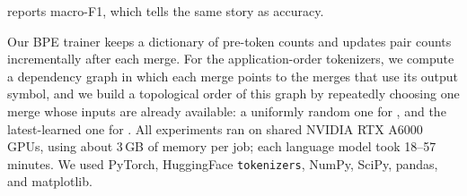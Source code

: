  reports macro-F1, which tells the same story as accuracy.

\begin{table}[h]
    \centering
    \caption{Fine-tuned macro-F1 (\%, mean $\pm$ sd over 4 runs) and relative change against \freq. Best mean per task in \textbf{bold}. Mean test length in tokens is shown in parentheses, which reflects compression.}
    \label{tab:f1}
\end{table}

Our BPE trainer keeps a dictionary of pre-token counts and updates pair counts incrementally after each merge.
For the application-order tokenizers, we compute a dependency graph in which each merge points to the merges that use its output symbol, and we build a topological order of this graph by repeatedly choosing one merge whose inputs are already available: a uniformly random one for \randorder, and the latest-learned one for \revorder.
All experiments ran on shared NVIDIA RTX A6000 GPUs, using about 3\,GB of memory per job; each language model took 18--57 minutes.
We used PyTorch, HuggingFace \texttt{tokenizers}, NumPy, SciPy, pandas, and matplotlib.
